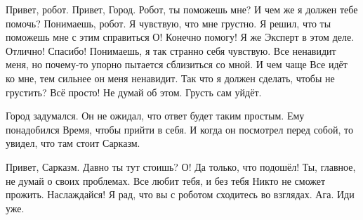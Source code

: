 \begin{dialog}
\X Привет, робот.
\R Привет, Город.
\X Робот, ты поможешь мне?
\R И чем же я должен тебе помочь?
\X Понимаешь, робот. Я чувствую, что мне грустно. Я решил, что ты поможешь мне с этим справиться
\R О! Конечно помогу! Я же Эксперт в этом деле.
\X Отлично! Спасибо! Понимаешь, я так странно себя чувствую. Все ненавидит меня, но почему-то упорно пытается сблизиться со мной. И чем чаще Все идёт ко мне, тем сильнее он меня ненавидит. Так что я должен сделать, чтобы не грустить?
\R Всё просто! Не думай об этом. Грусть сам уйдёт.
\end{dialog}

\begin{monolog}
Город задумался. Он не ожидал, что ответ будет таким простым. Ему понадобился Время, чтобы прийти в себя. И когда он посмотрел перед собой, то увидел, что там стоит Сарказм.
\end{monolog}

\begin{dialog}
\Y Привет, Сарказм. Давно ты тут стоишь?
\X О! Да только, что подошёл! Ты, главное, не думай о своих проблемах. Все любит тебя, и без тебя Никто не сможет прожить. Наслаждайся!
\Y Я рад, что вы с роботом сходитесь во взглядах.
\X Ага. Иди уже.
\end{dialog}